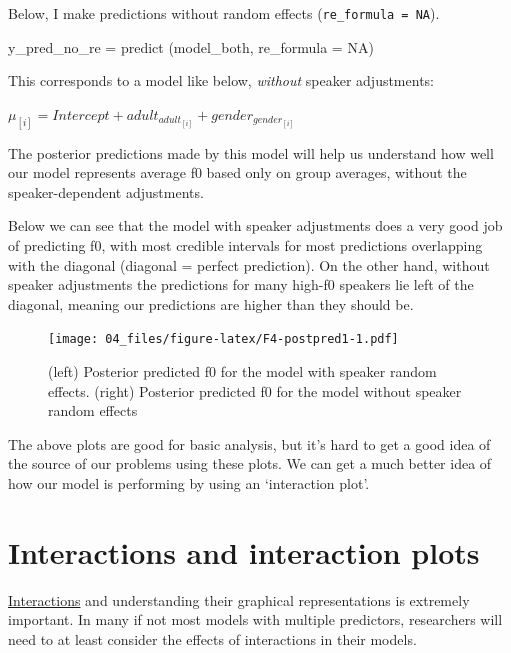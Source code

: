 \documentclass[
]{book}
\newenvironment{Shaded}{\begin{snugshade}}{\end{snugshade}}
\newcommand{\AttributeTok}[1]{\textcolor[rgb]{0.77,0.63,0.00}{#1}}
\newcommand{\ConstantTok}[1]{\textcolor[rgb]{0.00,0.00,0.00}{#1}}
\newcommand{\FunctionTok}[1]{\textcolor[rgb]{0.00,0.00,0.00}{#1}}
\newcommand{\NormalTok}[1]{#1}
\newcommand{\OtherTok}[1]{\textcolor[rgb]{0.56,0.35,0.01}{#1}}
\begin{document}
Below, I make predictions without random effects (\texttt{re\_formula\ =\ NA}).

\begin{Shaded}
\begin{Highlighting}[]
\NormalTok{y\_pred\_no\_re }\OtherTok{=} \FunctionTok{predict}\NormalTok{ (model\_both, }\AttributeTok{re\_formula =} \ConstantTok{NA}\NormalTok{)}
\end{Highlighting}
\end{Shaded}

This corresponds to a model like below, \emph{without} speaker adjustments:

\(\mu_{[i]} = Intercept + adult_{adult_{[i]}} + gender_{gender_{[i]}}\)

The posterior predictions made by this model will help us understand how well our model represents average f0 based only on group averages, without the speaker-dependent adjustments.

Below we can see that the model with speaker adjustments does a very good job of predicting f0, with most credible intervals for most predictions overlapping with the diagonal (diagonal = perfect prediction). On the other hand, without speaker adjustments the predictions for many high-f0 speakers lie left of the diagonal, meaning our predictions are higher than they should be.

\begin{figure}
\centering
\texttt{[image: 04\_files/figure-latex/F4-postpred1-1.pdf]}
\caption{\label{fig:F4-postpred1}(left) Posterior predicted f0 for the model with speaker random effects. (right) Posterior predicted f0 for the model without speaker random effects}
\end{figure}

The above plots are good for basic analysis, but it's hard to get a good idea of the source of our problems using these plots. We can get a much better idea of how our model is performing by using an `interaction plot'.

\hypertarget{interactions-and-interaction-plots}{%
\section{Interactions and interaction plots}\label{interactions-and-interaction-plots}}

\href{http://glimo.vub.ac.be/downloads/interaction.htm}{Interactions} and understanding their graphical representations is extremely important. In many if not most models with multiple predictors, researchers will need to at least consider the effects of interactions in their models.
\end{document}
